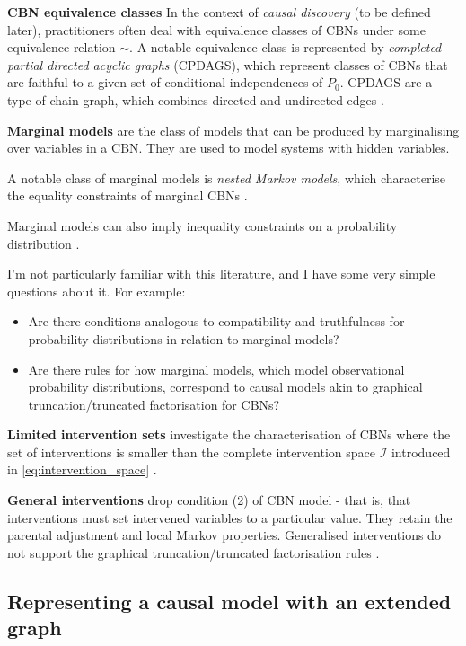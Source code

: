 \textbf{CBN equivalence classes} In the context of \emph{causal discovery} (to be defined later), practitioners often deal with equivalence classes of CBNs under some equivalence relation $\sim$. A notable equivalence class is represented by \emph{completed partial directed acyclic graphs} (CPDAGS), which represent classes of CBNs that are faithful to a given set of conditional independences of $P_0$. CPDAGS are a type of chain graph, which combines directed and undirected edges \cite{spirtes_causation_1993}\cite{chickering_optimal_2003}.

\textbf{Marginal models} are the class of models that can be produced by marginalising over variables in a CBN. They are used to model systems with hidden variables. 

A notable class of marginal models is \emph{nested Markov models}, which characterise the equality constraints of marginal CBNs \cite{evans_margins_2015}. 

Marginal models can also imply inequality constraints on a probability distribution \cite{kang_inequality_2012}.

I'm not particularly familiar with this literature, and I have some very simple questions about it. For example:

\begin{itemize}
    \item Are there conditions analogous to compatibility and truthfulness for probability distributions in relation to marginal models?
    \item Are there rules for how marginal models, which model observational probability distributions, correspond to causal models akin to graphical truncation/truncated factorisation for CBNs?
\end{itemize}

\textbf{Limited intervention sets} investigate the characterisation of CBNs where the set of interventions is smaller than the complete intervention space $\mathcal{I}$ introduced in \ref{eq:intervention_space} \cite{hauser_characterization_2012}.

\textbf{General interventions} drop condition (2) of CBN model - that is, that interventions must set intervened variables to a particular value. They retain the parental adjustment and local Markov properties. Generalised interventions do not support the graphical truncation/truncated factorisation rules \cite{yang_characterizing_2018}.

\subsection*{Representing a causal model with an extended graph}

